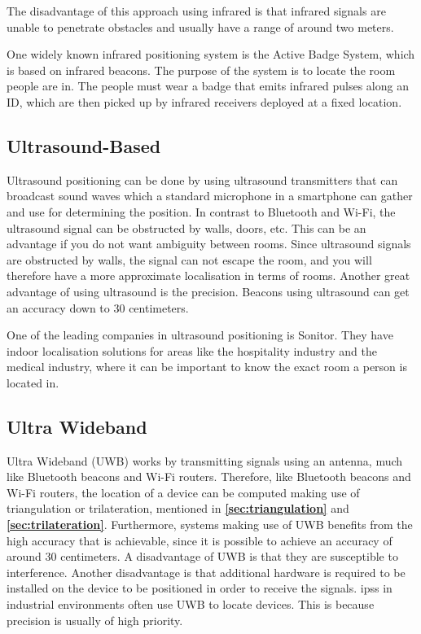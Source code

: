 The disadvantage of this approach using infrared is that infrared signals are unable to penetrate obstacles and usually have a range of around two meters\cite{HabilitationThesis}.

One widely known infrared positioning system is the Active Badge System, which is based on infrared beacons. The purpose of the system is to locate the room people are in. The people must wear a badge that emits infrared pulses along an ID, which are then picked up by infrared receivers deployed at a fixed location.\cite{HabilitationThesis}



\subsection{Ultrasound-Based}
Ultrasound positioning can be done by using ultrasound transmitters that can broadcast sound waves which a standard microphone in a smartphone can gather and use for determining the position\cite{IPSMapsPeople}. In contrast to Bluetooth and Wi-Fi, the ultrasound signal can be obstructed by walls, doors, etc. This can be an advantage if you do not want ambiguity between rooms. Since ultrasound signals are obstructed by walls, the signal can not escape the room, and you will therefore have a more approximate localisation in terms of rooms.\cite{leverage-ultrasound} Another great advantage of using ultrasound is the precision. Beacons using ultrasound can get an accuracy down to 30 centimeters.\cite{mapspeopleultrasound}

One of the leading companies in ultrasound positioning is Sonitor. They have indoor localisation solutions for areas like the hospitality industry and the medical industry, where it can be important to know the exact room a person is located in.\cite{sonitor}

\subsection{Ultra Wideband}
Ultra Wideband (UWB) works by transmitting signals using an antenna, much like Bluetooth beacons and Wi-Fi routers. Therefore, like Bluetooth beacons and Wi-Fi routers, the location of a device can be computed making use of triangulation or trilateration, mentioned in \textbf{\autoref{sec:triangulation}} and \textbf{\autoref{sec:trilateration}}. Furthermore, systems making use of UWB benefits from the high accuracy that is achievable, since it is possible to achieve an accuracy of around 30 centimeters. A disadvantage of UWB is that they are susceptible to interference.\cite{oriient} Another disadvantage is that additional hardware is required to be installed on the device to be positioned in order to receive the signals\cite{LundIMU}.
\gls{ips}s in industrial environments often use UWB to locate devices. This is because precision is usually of high priority.\cite{Infsoft}

